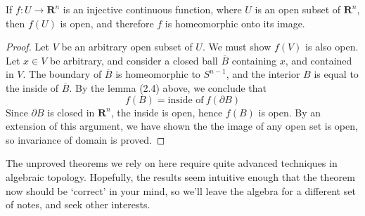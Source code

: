 \begin{theorem}
    If $f:U \to \mathbf{R}^n$ is an injective continuous function, where $U$ is an open subset of $\mathbf{R}^n$, then $f(U)$ is open, and therefore $f$ is homeomorphic onto its image.
\end{theorem}
\begin{proof}
    Let $V$ be an arbitrary open subset of $U$. We must show $f(V)$ is also open. Let $x \in V$ be arbitrary, and consider a closed ball $\overline{B}$ containing $x$, and contained in $V$. The boundary of $\overline{B}$ is homeomorphic to $S^{n-1}$, and the interior $B$ is equal to the inside of $\overline{B}$. By the lemma (2.4) above, we conclude that
    \[ f(B) = \text{inside of}\ f(\partial B) \]
    Since $\partial B$ is closed in $\mathbf{R}^n$, the inside is open, hence $f(B)$ is open. By an extension of this argument, we have shown the the image of any open set is open, so invariance of domain is proved.
\end{proof}

The unproved theorems we rely on here require quite advanced techniques in algebraic topology. Hopefully, the results seem intuitive enough that the theorem now should be `correct' in your mind, so we'll leave the algebra for a different set of notes, and seek other interests.